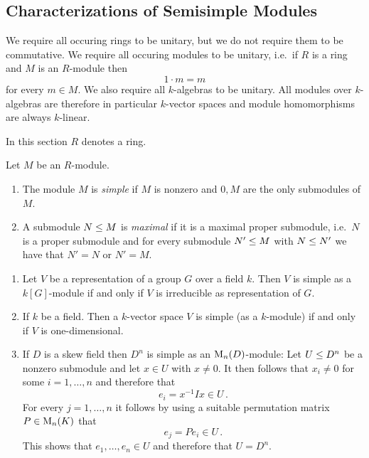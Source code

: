 \subsection{Characterizations of Semisimple Modules}


\begin{conventions}
  We require all occuring rings to be unitary, but we do not require them to be commutative.
  We require all occuring modules to be unitary, i.e.\ if $R$ is a ring and $M$ is an $R$-module then
  \[
      1 \cdot m
    = m
  \]
  for every $m \in M$.
  We also require all $k$-algebras to be unitary.
  All modules over $k$-algebras are therefore in particular $k$-vector spaces and module homomorphisms are always $k$-linear.
\end{conventions}


\begin{conventions}
  In this section $R$ denotes a ring.
\end{conventions}


\begin{definition}
  \label{definition: simple and maximal modules}
  Let $M$ be an $R$-module.
  \begin{enumerate}
    \item
      The module $M$ is \emph{simple} if $M$ is nonzero and $0, M$ are the only submodules of $M$.
    \item
      A submodule $N \leq M$ is \emph{maximal} if it is a maximal proper submodule, i.e.\ $N$ is a proper submodule and for every submodule $N' \leq M$ with $N \leq N'$ we have that $N' = N$ or $N' = M$.
  \end{enumerate}
\end{definition}


\begin{example}
  \label{example: simple modules}
  \leavevmode
  \begin{enumerate}
    \item
      Let $V$ be a representation of a group $G$ over a field $k$.
      Then $V$ is simple as a $k[G]$-module if and only if $V$ is irreducible as representation of $G$.
    \item
      If $k$ be a field.
      Then a $k$-vector space $V$ is simple (as a $k$-module) if and only if $V$ is one-dimensional.
    \item
      If $D$ is a skew field then $D^n$ is simple as an $\operatorname{M}_n(D)$-module:
      Let $U \leq D^n$ be a nonzero submodule and let $x \in U$ with $x \neq 0$.
      It then follows that $x_i \neq 0$ for some $i = 1, \dotsc, n$ and therefore that
      \[
            e_i
        =   x^{-1} I x
        \in U \,.
      \]
      For every $j = 1, \dotsc, n$ it follows by using a suitable permutation matrix $P \in \operatorname{M}_n(K)$ that
      \[
            e_j
        =   P e_i
        \in U \,.
      \]
      This shows that $e_1, \dotsc, e_n \in U$ and therefore that $U = D^n$.
  \end{enumerate}
\end{example}


